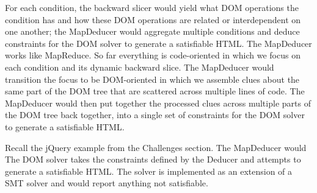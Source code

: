 For each condition, the backward slicer would yield what DOM operations the condition has and how these DOM operations are related or interdependent on one another; the MapDeducer would aggregate multiple conditions and deduce constraints for the DOM solver to generate a satisfiable HTML.  
The MapDeducer works like MapReduce.  So far everything is code-oriented in which we focus on each condition and its dynamic backward slice.  The MapDeducer would transition the focus to be DOM-oriented in which we assemble clues about the same part of the DOM tree that are scattered across multiple lines of code.  
The MapDeducer would then put together the processed clues across multiple parts of the DOM tree back together, into a single set of constraints for the DOM solver to generate a satisfiable HTML.  

Recall the jQuery example from the Challenges section.  The MapDeducer would 
The DOM solver takes the constraints defined by the Deducer and attempts to generate a satisfiable HTML.  The solver is implemented as an extension of a SMT solver and would report anything not satisfiable.  

	





